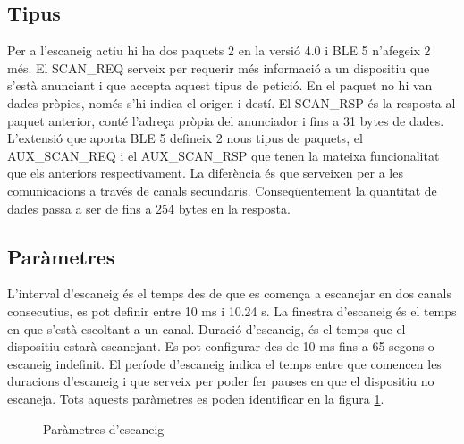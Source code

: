 \subsection{Tipus}
Per a l'escaneig actiu hi ha dos paquets 2 en la versió 4.0 i BLE 5 n'afegeix 2 més.
El SCAN\_REQ serveix per requerir més informació a un dispositiu que s'està anunciant i que accepta aquest tipus de petició.
En el paquet no hi van dades pròpies, només s'hi indica el origen i destí.
El SCAN\_RSP és la resposta al paquet anterior, conté l'adreça pròpia del anunciador i fins a 31 bytes de dades.
L'extensió que aporta BLE 5 defineix 2 nous tipus de paquets, el AUX\_SCAN\_REQ i el AUX\_SCAN\_RSP que tenen la mateixa funcionalitat que els anteriors respectivament.
La diferència és que serveixen per a les comunicacions a través de canals secundaris.
Conseqüentement la quantitat de dades passa a ser de fins a 254 bytes en la resposta.

\subsection{Paràmetres}
L'interval d'escaneig és el temps des de que es comença a escanejar en dos canals consecutius, es pot definir entre 10 ms i 10.24 s.
La finestra d'escaneig és el temps en que s'està escoltant a un canal.
Duració d'escaneig, és el temps que el dispositiu estarà escanejant.
Es pot configurar des de 10 ms fins a 65 segons o escaneig indefinit.
El període d'escaneig indica el temps entre que comencen les duracions d'escaneig i que serveix per poder fer pauses en que el dispositiu no escaneja.
Tots aquests paràmetres es poden identificar en la figura \ref{fig:escaneig_canals}.

\begin{figure}[!h]
	\begin{center}
		\begin{subfigmatrix}{1}
		\end{subfigmatrix}
	\end{center}
	\caption{Paràmetres d'escaneig}
	\label{fig:escaneig_canals}
\end{figure}

